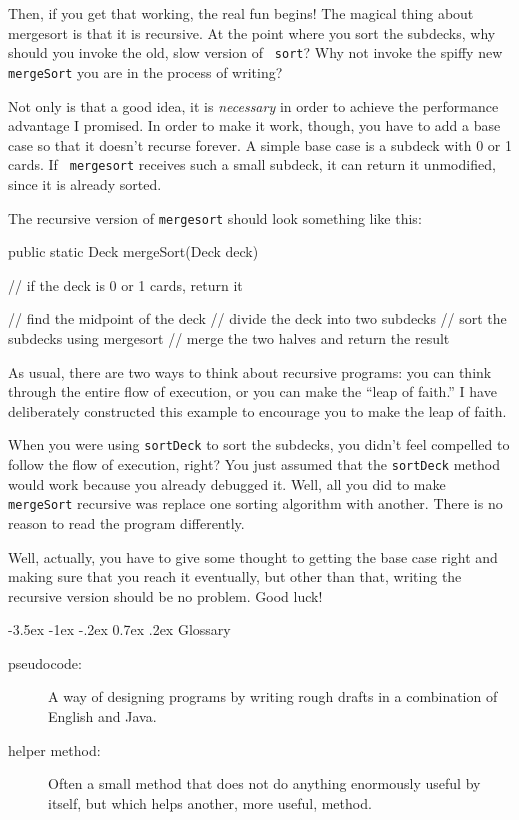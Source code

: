 \documentclass{book}
\makeatletter
\renewcommand{\section}{\@startsection 
    {section} {1} {0mm}%
    {-3.5ex \@plus -1ex \@minus -.2ex}%
    {0.7ex \@plus.2ex}%
    {\normalfont\Large\bfseries}}
\makeatother
\begin{document}
Then, if you get that working, the real fun begins!  The magical thing
about mergesort is that it is recursive.  At the point where you sort
the subdecks, why should you invoke the old, slow version of {\tt
sort}?  Why not invoke the spiffy new {\tt mergeSort} you are in the
process of writing?


Not only is that a good idea, it is {\em necessary} in order to
achieve the performance advantage I promised.  In order to make it
work, though, you have to add a base case so that it doesn't recurse
forever.  A simple base case is a subdeck with 0 or 1 cards.  If {\tt
mergesort} receives such a small subdeck, it can return it
unmodified, since it is already sorted.

The recursive version of {\tt mergesort} should look something
like this:

\begin{verbatimtab}
public static Deck mergeSort(Deck deck) {
    // if the deck is 0 or 1 cards, return it

    // find the midpoint of the deck
    // divide the deck into two subdecks
    // sort the subdecks using mergesort
    // merge the two halves and return the result
}
\end{verbatimtab}
%
As usual, there are two ways to think about recursive programs:
you can think through the entire flow of execution, or you
can make the ``leap of faith.''  I have deliberately constructed
this example to encourage you to make the leap of faith.


When you were using {\tt sortDeck} to sort the subdecks, you didn't
feel compelled to follow the flow of execution, right?  You just
assumed that the {\tt sortDeck} method would work because you already
debugged it.  Well, all you did to make {\tt mergeSort} recursive was
replace one sorting algorithm with another.  There is no reason to read
the program differently.

Well, actually, you have to give some thought to getting the
base case right and making sure that you reach it eventually,
but other than that, writing the recursive version should be
no problem.  Good luck!


\section{Glossary}

\begin{description}

\item[pseudocode:]  A way of designing programs by writing
rough drafts in a combination of English and Java.

\item[helper method:]  Often a small method that does not
do anything enormously useful by itself, but which helps
another, more useful, method.



\end{description}
\end{document}
